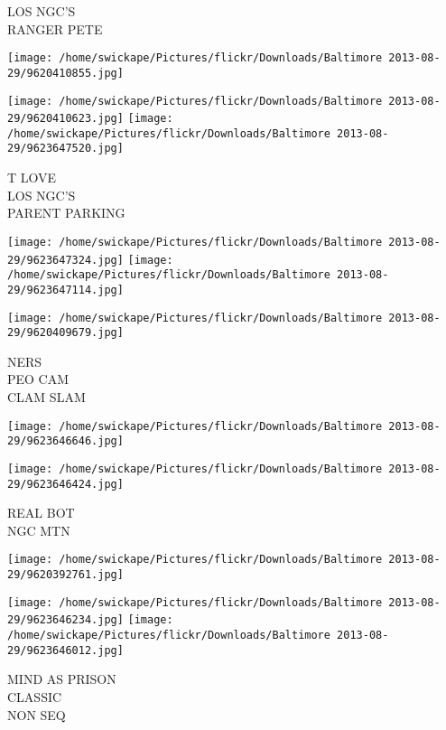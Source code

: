 \documentclass[10pt,letterpaper]{article}
\begin{document}
LOS NGC'S\\
RANGER PETE\\
\pagebreak

\texttt{[image: /home/swickape/Pictures/flickr/Downloads/Baltimore 2013-08-29/9620410855.jpg]}

\vspace{0.25in}
\texttt{[image: /home/swickape/Pictures/flickr/Downloads/Baltimore 2013-08-29/9620410623.jpg]}
\texttt{[image: /home/swickape/Pictures/flickr/Downloads/Baltimore 2013-08-29/9623647520.jpg]}

T LOVE\\
LOS NGC'S\\
PARENT PARKING\\
\pagebreak

\texttt{[image: /home/swickape/Pictures/flickr/Downloads/Baltimore 2013-08-29/9623647324.jpg]}
\texttt{[image: /home/swickape/Pictures/flickr/Downloads/Baltimore 2013-08-29/9623647114.jpg]}

\vspace{0.25in}
\texttt{[image: /home/swickape/Pictures/flickr/Downloads/Baltimore 2013-08-29/9620409679.jpg]}

NERS\\
PEO CAM\\
CLAM SLAM\\
\pagebreak

\texttt{[image: /home/swickape/Pictures/flickr/Downloads/Baltimore 2013-08-29/9623646646.jpg]}

\vspace{0.25in}
\texttt{[image: /home/swickape/Pictures/flickr/Downloads/Baltimore 2013-08-29/9623646424.jpg]}

REAL BOT\\
NGC MTN\\
\pagebreak

\texttt{[image: /home/swickape/Pictures/flickr/Downloads/Baltimore 2013-08-29/9620392761.jpg]}

\vspace{0.25in}
\texttt{[image: /home/swickape/Pictures/flickr/Downloads/Baltimore 2013-08-29/9623646234.jpg]}
\texttt{[image: /home/swickape/Pictures/flickr/Downloads/Baltimore 2013-08-29/9623646012.jpg]}

MIND AS PRISON\\
CLASSIC\\
NON SEQ\\
\pagebreak
\end{document}
